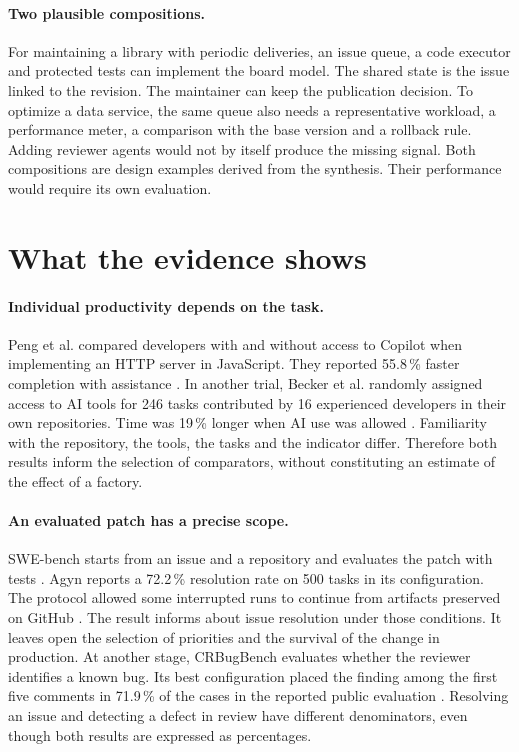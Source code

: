 \documentclass[11pt,a4paper]{article}
\begin{document}
\paragraph{Two plausible compositions.}
For maintaining a library with periodic deliveries, an issue queue, a code executor and protected tests can implement the board model. The shared state is the issue linked to the revision. The maintainer can keep the publication decision. To optimize a data service, the same queue also needs a representative workload, a performance meter, a comparison with the base version and a rollback rule. Adding reviewer agents would not by itself produce the missing signal. Both compositions are design examples derived from the synthesis. Their performance would require its own evaluation.

\section{What the evidence shows}
\paragraph{Individual productivity depends on the task.}
Peng et al. compared developers with and without access to Copilot when implementing an HTTP server in JavaScript. They reported 55.8\,\% faster completion with assistance \citep{peng}. In another trial, Becker et al. randomly assigned access to AI tools for 246 tasks contributed by 16 experienced developers in their own repositories. Time was 19\,\% longer when AI use was allowed \citep{metr}. Familiarity with the repository, the tools, the tasks and the indicator differ. Therefore both results inform the selection of comparators, without constituting an estimate of the effect of a factory.

\paragraph{An evaluated patch has a precise scope.}
SWE-bench starts from an issue and a repository and evaluates the patch with tests \citep{swebench}. Agyn reports a 72.2\,\% resolution rate on 500 tasks in its configuration. The protocol allowed some interrupted runs to continue from artifacts preserved on GitHub \citep[sections 4 and 5]{agyn}. The result informs about issue resolution under those conditions. It leaves open the selection of priorities and the survival of the change in production. At another stage, CRBugBench evaluates whether the reviewer identifies a known bug. Its best configuration placed the finding among the first five comments in 71.9\,\% of the cases in the reported public evaluation \citep{review}. Resolving an issue and detecting a defect in review have different denominators, even though both results are expressed as percentages.
\end{document}
